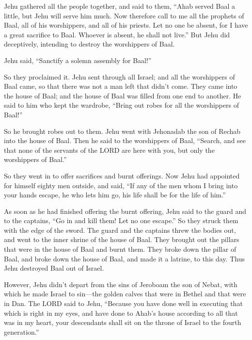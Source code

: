  Jehu gathered all the people together, and said to them,
``Ahab served Baal a little, but Jehu will serve him much. 
Now therefore call to me all the prophets of Baal, all of his
worshippers, and all of his priests. Let no one be absent, for I have a
great sacrifice to Baal. Whoever is absent, he shall not live.'' But
Jehu did deceptively, intending to destroy the worshippers of Baal.

 Jehu said, ``Sanctify a solemn assembly for Baal!''

So they proclaimed it.  Jehu sent through all Israel; and
all the worshippers of Baal came, so that there was not a man left that
didn't come. They came into the house of Baal; and the house of Baal was
filled from one end to another.  He said to him who kept
the wardrobe, ``Bring out robes for all the worshippers of Baal!''

So he brought robes out to them.  Jehu went with Jehonadab
the son of Rechab into the house of Baal. Then he said to the
worshippers of Baal, ``Search, and see that none of the servants of the
LORD are here with you, but only the worshippers of Baal.''

 So they went in to offer sacrifices and burnt offerings.
Now Jehu had appointed for himself eighty men outside, and said, ``If
any of the men whom I bring into your hands escape, he who lets him go,
his life shall be for the life of him.''

 As soon as he had finished offering the burnt offering,
Jehu said to the guard and to the captains, ``Go in and kill them! Let
no one escape.'' So they struck them with the edge of the sword. The
guard and the captains threw the bodies out, and went to the inner
shrine of the house of Baal.  They brought out the pillars
that were in the house of Baal and burnt them.  They broke
down the pillar of Baal, and broke down the house of Baal, and made it a
latrine, to this day.  Thus Jehu destroyed Baal out of
Israel.

 However, Jehu didn't depart from the sins of Jeroboam the
son of Nebat, with which he made Israel to sin---the golden calves that
were in Bethel and that were in Dan.  The LORD said to
Jehu, ``Because you have done well in executing that which is right in
my eyes, and have done to Ahab's house according to all that was in my
heart, your descendants shall sit on the throne of Israel to the fourth
generation.''

